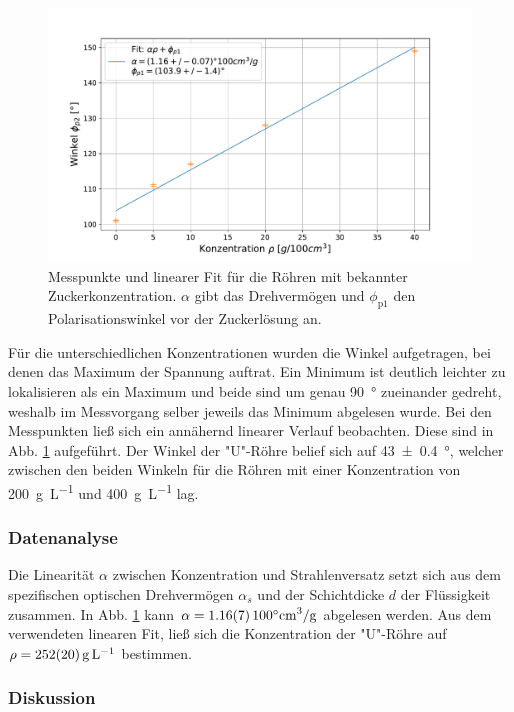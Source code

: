 		\begin{figure}[ht]
			\centering
			\includegraphics[width=\textwidth]{data/konzentration.pdf}
			\caption{Messpunkte und linearer Fit für die Röhren mit bekannter Zuckerkonzentration. $\alpha$ gibt das Drehvermögen und $\phi_\text{p1}$ den Polarisationswinkel vor der Zuckerlösung an.}
			\label{fig:ZuckerGerade}	
		\end{figure}
		Für die unterschiedlichen Konzentrationen wurden die Winkel aufgetragen, bei denen das Maximum der Spannung auftrat.
		Ein Minimum ist deutlich leichter zu lokalisieren als ein Maximum und beide sind um genau \SI{90}{\degree} zueinander gedreht, weshalb im Messvorgang selber jeweils das Minimum abgelesen wurde.
		Bei den Messpunkten ließ sich ein annähernd linearer Verlauf beobachten.
		Diese sind in Abb. \ref{fig:ZuckerGerade} aufgeführt.
		Der Winkel der "U"-Röhre belief sich auf \SI{43+-0,4}{\degree}, welcher zwischen den beiden Winkeln für die Röhren mit einer Konzentration von \SI{200}{\gram\per\liter} und \SI{400}{\gram\per\liter} lag.		
	
	\subsubsection*{Datenanalyse}
		
		Die Linearität $\alpha$ zwischen Konzentration und Strahlenversatz setzt sich aus dem spezifischen optischen Drehvermögen $\alpha_s$ und der Schichtdicke $d$ der Flüssigkeit zusammen.
		In Abb. \ref{fig:ZuckerGerade} kann $\alpha=\SI{1,16+-0,07}{100\degree\centi\meter\cubed\per\gram}$ abgelesen werden.
		Aus dem verwendeten linearen Fit, ließ sich die Konzentration der "U"-Röhre auf $\rho = \SI{252+-20}{\gram\per\liter}$ bestimmen.
	
	\subsubsection*{Diskussion}
	
